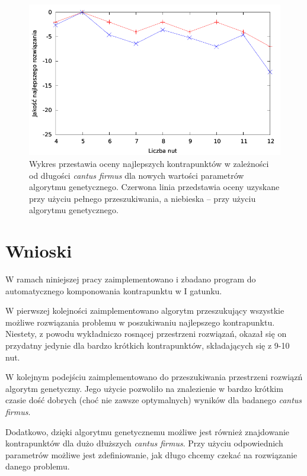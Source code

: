 \documentclass{article}
\begin{document}
\begin{figure}[htb]
\centering
\includegraphics[width=1.0\textwidth]{images/liczba_nut_a_jakosc_poprawki.pdf}
\caption{Wykres przestawia oceny najlepszych kontrapunktów w zależności od długości \emph{cantus firmus} dla nowych wartości parametrów algorytmu genetycznego. Czerwona linia przedstawia oceny uzyskane przy użyciu pełnego przeszukiwania, a niebieska -- przy użyciu algorytmu genetycznego.}
\label{fig:liczba_nut_a_jakosc_poprawki}
\end{figure}


\section{Wnioski}

W ramach niniejszej pracy zaimplementowano i zbadano program do automatycznego komponowania kontrapunktu w I gatunku.

W pierwszej kolejności zaimplementowano algorytm przeszukujący wszystkie możliwe rozwiązania problemu w poszukiwaniu najlepszego kontrapunktu. Niestety, z powodu wykładniczo rosnącej przestrzeni rozwiązań, okazał się on przydatny jedynie dla bardzo krótkich kontrapunktów, składających się z 9-10 nut.

W kolejnym podejściu zaimplementowano do przeszukiwania przestrzeni rozwiązń algorytm genetyczny. Jego użycie pozwoliło na znalezienie w bardzo krótkim czasie dość dobrych (choć nie zawsze optymalnych) wyników dla badanego \emph{cantus firmus}.

Dodatkowo, dzięki algorytmu genetycznemu możliwe jest również znajdowanie kontrapunktów dla dużo dłuższych \emph{cantus firmus}. Przy użyciu odpowiednich parametrów możliwe jest zdefiniowanie, jak długo chcemy czekać na rozwiązanie danego problemu.

\clearpage



\end{document}
